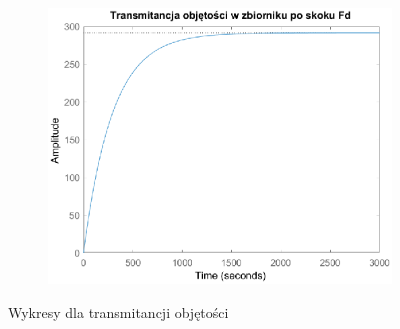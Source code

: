 \begin{figure}[h!]
   \begin{subfigure}[b]{0.6\textwidth}
      \includegraphics[width=1\linewidth]{img/transforms/transformVFd.eps}
      \caption{}
      \label{fig:fig:transformV3}
   \end{subfigure}
       
   \caption{Wykresy dla transmitancji objętości}
   \label{fig:transformV}
\end{figure}
           

